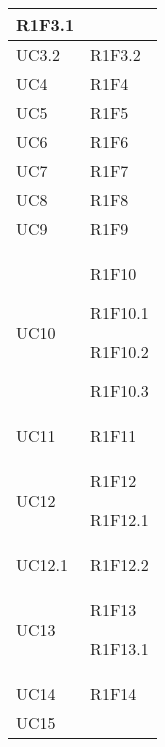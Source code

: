 \begin{center}
\begin{longtable}{|p{44mm}|p{22mm}|}
R1F3.1 \newline
\\
\hline
UC3.2 &

R1F3.2 \newline
\\
\hline
UC4 &

R1F4 \newline
\\
\hline
UC5 &

R1F5 \newline
\\
\hline
UC6 &

R1F6 \newline
\\
\hline
UC7 &

R1F7 \newline
\\
\hline
UC8 &

R1F8 \newline
\\
\hline
UC9 &

R1F9 \newline
\\
\hline
UC10 &

R1F10 \newline

R1F10.1 \newline

R1F10.2 \newline

R1F10.3 \newline
\\
\hline
UC11 &

R1F11 \newline
\\
\hline
UC12 &

R1F12 \newline

R1F12.1 \newline
\\
\hline
UC12.1 &

R1F12.2 \newline
\\
\hline
UC13 &

R1F13 \newline

R1F13.1 \newline
\\
\hline
UC14 &

R1F14 \newline
\\
\hline
UC15 &


\end{longtable}
\end{center}
